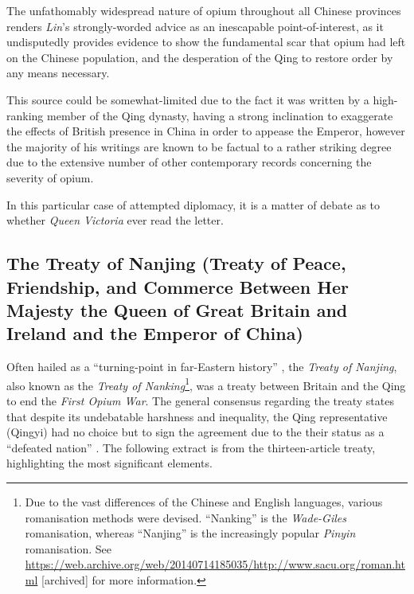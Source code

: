 \documentclass{article}
\begin{document}
        The unfathomably widespread nature of opium throughout all Chinese provinces renders \textit{Lin}'s strongly-worded advice as an inescapable point-of-interest, as it undisputedly provides evidence to show the fundamental scar that opium had left on the Chinese population, and the desperation of the Qing to restore order by any means necessary.

        This source could be somewhat-limited due to the fact it was written by a high-ranking member of the Qing dynasty, having a strong inclination to exaggerate the effects of British presence in China in order to appease the Emperor, however the majority of his writings are known to be factual to a rather striking degree due to the extensive number of other contemporary records concerning the severity of opium.

        In this particular case of attempted diplomacy, it is a matter of debate as to whether \textit{Queen Victoria} ever read the letter.

\subsection{The Treaty of Nanjing (Treaty of Peace, Friendship, and Commerce Between Her Majesty the Queen of Great Britain and Ireland and the Emperor of China)}

        Often hailed as a ``turning-point in far-Eastern history'' \autocite{Fairbank:1940}, the \textit{Treaty of Nanjing}, also known as the \textit{Treaty of Nanking}\footnote{Due to the vast differences of the Chinese and English languages, various romanisation methods were devised. ``Nanking'' is the \textit{Wade-Giles} romanisation, whereas ``Nanjing'' is the increasingly popular \textit{Pinyin} romanisation. See \url{https://web.archive.org/web/20140714185035/http://www.sacu.org/roman.html} [archived] for more information.}, was a treaty between Britain and the Qing to end the \textit{First Opium War}. The general consensus regarding the treaty states that despite its undebatable harshness and inequality, the Qing representative (Qingyi) had no choice but to sign the agreement due to the their status as a ``defeated nation''
\autocite{Mao:2018}. The following extract is from the thirteen-article treaty, highlighting the most significant elements.

\end{document}
